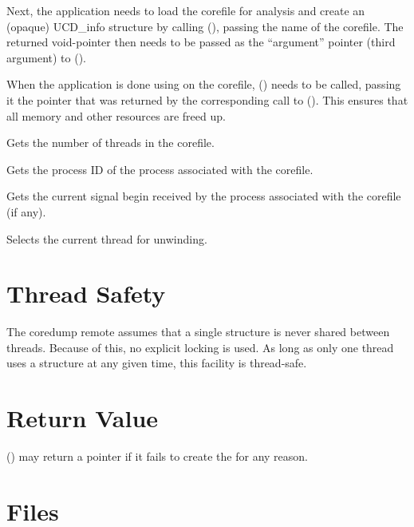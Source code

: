 \documentclass{article}
\begin{document}
Next, the application needs to load the corefile for analysis and create an
(opaque) UCD\_info structure by calling (),
passing the name of the corefile.
The returned void-pointer then needs to be
passed as the ``argument'' pointer (third argument) to
().

When the application is done using  on the corefile,
() needs to be called,
passing it the pointer that was returned by the corresponding call to
().
This ensures that all memory and other resources are freed up.

\begin{description}[style=nextline]

\item[\_UCD\_get\_num\_threads()]
    Gets the number of threads in the corefile.

\item[\_UCD\_get\_pid()]
    Gets the process ID of the process associated with the corefile.

\item[\_UCD\_get\_cursig()]
    Gets the current signal begin received by the process associated with the
    corefile (if any).

\item[\_UCD\_select\_thread()]
    Selects the current thread for unwinding.

\end{description}

\section{Thread Safety}

The coredump remote assumes that a single 
structure is never shared between threads.
Because of this,
no explicit locking is used.
As long as only one thread uses a  structure at any given time,
this facility is thread-safe.

\section{Return Value}

() may return a  pointer if it fails
to create the  for any reason.

\section{Files}
\end{document}
